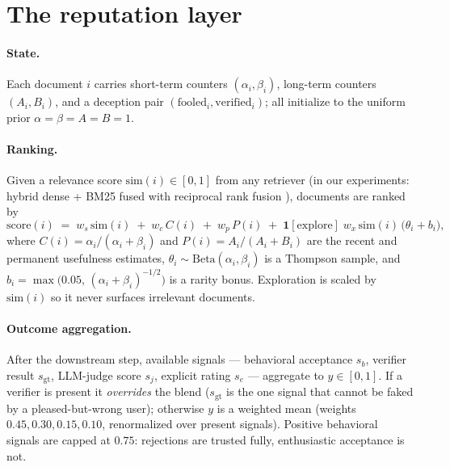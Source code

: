 \documentclass[11pt]{article}
\newcommand{\sgt}{s_{\mathrm{gt}}}
\begin{document}
\section{The reputation layer}
\label{sec:method}

\paragraph{State.} Each document $i$ carries short-term counters
$(\alpha_i, \beta_i)$, long-term counters $(A_i, B_i)$, and a deception pair
$(\mathrm{fooled}_i, \mathrm{verified}_i)$; all initialize to the uniform
prior $\alpha=\beta=A=B=1$.

\paragraph{Ranking.} Given a relevance score $\mathrm{sim}(i) \in [0,1]$ from
any retriever (in our experiments: hybrid dense + BM25 fused with reciprocal
rank fusion \citep{cormack2009rrf}), documents are ranked by
\begin{equation}
\mathrm{score}(i) \;=\; w_s\,\mathrm{sim}(i) \;+\; w_c\,C(i) \;+\; w_p\,P(i)
\;+\; \mathbf{1}[\text{explore}]\; w_x\,\mathrm{sim}(i)\,
\bigl(\theta_i + b_i\bigr),
\label{eq:score}
\end{equation}
where $C(i)=\alpha_i/(\alpha_i{+}\beta_i)$ and $P(i)=A_i/(A_i{+}B_i)$ are the
recent and permanent usefulness estimates, $\theta_i \sim
\mathrm{Beta}(\alpha_i,\beta_i)$ is a Thompson sample, and
$b_i = \max\!\bigl(0.05,\,(\alpha_i{+}\beta_i)^{-1/2}\bigr)$ is a rarity
bonus. Exploration is scaled by $\mathrm{sim}(i)$ so it never surfaces
irrelevant documents.

\paragraph{Outcome aggregation.} After the downstream step, available signals
--- behavioral acceptance $s_b$, verifier result $\sgt$, LLM-judge score
$s_j$, explicit rating $s_e$ --- aggregate to $y \in [0,1]$. If a verifier is
present it \emph{overrides} the blend ($\sgt$ is the one signal that cannot
be faked by a pleased-but-wrong user); otherwise $y$ is a weighted mean
(weights $0.45, 0.30, 0.15, 0.10$, renormalized over present signals).
Positive behavioral signals are capped at $0.75$: rejections are trusted
fully, enthusiastic acceptance is not.
\end{document}
